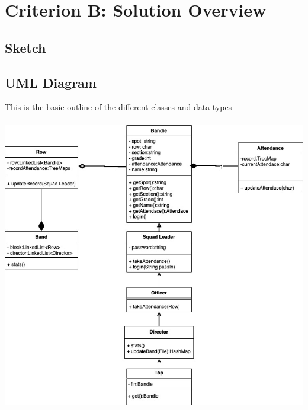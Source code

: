 \documentclass{article}
\begin{document}
\section{Criterion B: Solution Overview}
\subsection{Sketch}
\subsection{UML Diagram}
This is the basic outline of the different classes and data types \\ \\
\includegraphics[width=6in]{IA UML and Flowchart-UML.jpg}
\end{document}
